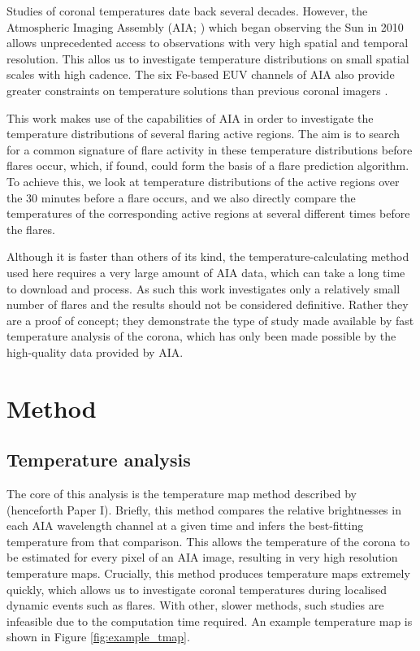 \documentclass[referee,a4paper,12pt]{swsc}
\begin{document}
\begin{linenumbers}
Studies of coronal temperatures date back several decades. %
However, the Atmospheric Imaging Assembly (AIA; \cite{Lemen2011}) which began observing the Sun in 2010 allows unprecedented access to observations with very high spatial and temporal resolution.
This allos us to investigate temperature distributions on small spatial scales with high cadence. %
The six Fe-based EUV channels of AIA also provide greater constraints on temperature solutions than previous coronal imagers \citep{Guennou2012, Guennou2012a}.

This work makes use of the capabilities of AIA in order to investigate the temperature distributions of several flaring active regions.
The aim is to search for a common signature of flare activity in these temperature distributions before flares occur, which, if found, could form the basis of a flare prediction algorithm.
To achieve this, we look at temperature distributions of the active regions over the 30 minutes before a flare occurs, and we also directly compare the temperatures of the corresponding active regions at several different times before the flares.

Although it is faster than others of its kind, the temperature-calculating method used here requires a very large amount of AIA data, which can take a long time to download and process.
As such this work investigates only a relatively small number of flares and the results should not be considered definitive.
Rather they are a proof of concept; they demonstrate the type of study made available by fast temperature analysis of the corona, which has only been made possible by the high-quality data provided by AIA.

\section{Method}
\subsection{Temperature analysis}
The core of this analysis is the temperature map method described by \cite{Leonard} (henceforth Paper I). 
Briefly, this method compares the relative brightnesses in each AIA wavelength channel at a given time and infers the best-fitting temperature from that comparison. %
This allows the temperature of the corona to be estimated for every pixel of an AIA image, resulting in very high resolution temperature maps.
Crucially, this method produces temperature maps extremely quickly, which allows us to investigate coronal temperatures during localised dynamic events such as flares.
With other, slower methods, such studies are infeasible due to the computation time required.
An example temperature map is shown in Figure \ref{fig:example_tmap}.


\end{linenumbers}
\end{document}
